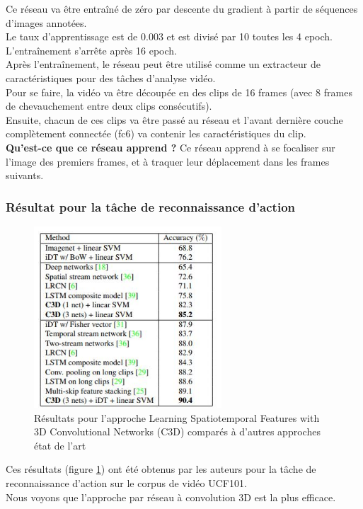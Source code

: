 \documentclass[11pt]{article}
\begin{document}
Ce réseau va être entraîné de zéro par descente du gradient à partir de séquences d'images annotées.\\
Le taux d'apprentissage est de 0.003 et est divisé par 10 toutes les 4 epoch.\\
L'entraînement s'arrête après 16 epoch.\\

Après l'entraînement, le réseau peut être utilisé comme un extracteur de caractéristiques pour des tâches d'analyse vidéo.\\
Pour se faire, la vidéo va être découpée en des clips de 16 frames (avec 8 frames de chevauchement entre deux clips consécutifs).\\
Ensuite, chacun de ces clips va être passé au réseau et l'avant dernière couche complètement connectée (fc6) va contenir les caractéristiques du clip.\\

\textbf{Qu'est-ce que ce réseau apprend ?} Ce réseau apprend à se focaliser sur l'image des premiers frames, et à traquer leur déplacement dans les frames suivants.\\

\subsubsection{Résultat pour la tâche de reconnaissance d'action}
\label{sec:org2209876}
\begin{figure}[htbp]
\centering
\includegraphics[width=7cm]{c3d_result.jpg}
\caption{Résultats pour l'approche Learning Spatiotemporal Features with 3D Convolutional Networks (C3D) comparés à d'autres approches état de l'art \label{c3d-res}}
\end{figure}
Ces résultats (figure \ref{c3d-res}) ont été obtenus par les auteurs pour la tâche de reconnaissance d'action sur le corpus de vidéo UCF101.\\
Nous voyons que l'approche par réseau à convolution 3D est la plus efficace.\\
\end{document}
